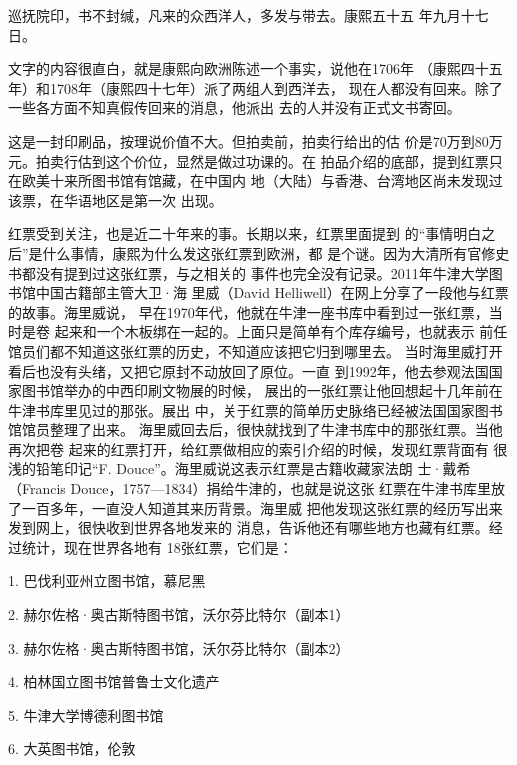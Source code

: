 {\bookkai 巡抚院印，书不封缄，凡来的众西洋人，多发与带去。康熙五十五}%
{\bookkai 年九月十七日。}%
\par
文字的内容很直白，就是康熙向欧洲陈述一个事实，说他在1706年%
（康熙四十五年）和1708年（康熙四十七年）派了两组人到西洋去，%
现在人都没有回来。除了一些各方面不知真假传回来的消息，他派出%
去的人并没有正式文书寄回。%
\par
这是一封印刷品，按理说价值不大。但拍卖前，拍卖行给出的估%
价是70万到80万元。拍卖行估到这个价位，显然是做过功课的。在%
拍品介绍的底部，提到红票只在欧美十来所图书馆有馆藏，在中国内%
地（大陆）与香港、台湾地区尚未发现过该票，在华语地区是第一次%
出现。%
\par
红票受到关注，也是近二十年来的事。长期以来，红票里面提到%
的“事情明白之后”是什么事情，康熙为什么发这张红票到欧洲，都%
是个谜。因为大清所有官修史书都没有提到过这张红票，与之相关的%
事件也完全没有记录。2011年牛津大学图书馆中国古籍部主管大卫·海%
里威（David Helliwell）在网上分享了一段他与红票的故事。海里威说，%
早在1970年代，他就在牛津一座书库中看到过一张红票，当时是卷%
起来和一个木板绑在一起的。上面只是简单有个库存编号，也就表示%
前任馆员们都不知道这张红票的历史，不知道应该把它归到哪里去。%
当时海里威打开看后也没有头绪，又把它原封不动放回了原位。一直%
到1992年，他去参观法国国家图书馆举办的中西印刷文物展的时候，%
展出的一张红票让他回想起十几年前在牛津书库里见过的那张。展出%
中，关于红票的简单历史脉络已经被法国国家图书馆馆员整理了出来。%
海里威回去后，很快就找到了牛津书库中的那张红票。当他再次把卷%
起来的红票打开，给红票做相应的索引介绍的时候，发现红票背面有%
很浅的铅笔印记“F. Douce”。海里威说这表示红票是古籍收藏家法朗%
士·戴希（Francis Douce，1757—1834）捐给牛津的，也就是说这张%
红票在牛津书库里放了一百多年，一直没人知道其来历背景。海里威%
把他发现这张红票的经历写出来发到网上，很快收到世界各地发来的%
消息，告诉他还有哪些地方也藏有红票。经过统计，现在世界各地有%
18张红票，它们是：%
\par
1. 巴伐利亚州立图书馆，慕尼黑%
\par
2. 赫尔佐格·奥古斯特图书馆，沃尔芬比特尔（副本1）%
\par
3. 赫尔佐格·奥古斯特图书馆，沃尔芬比特尔（副本2）%
\par
4. 柏林国立图书馆普鲁士文化遗产%
\par
5. 牛津大学博德利图书馆%
\par
6. 大英图书馆，伦敦%
\par
